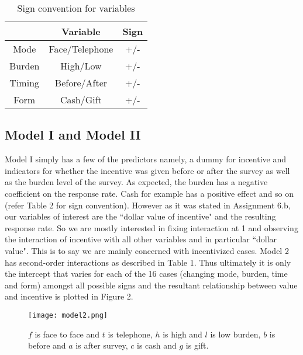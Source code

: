 \documentclass{article}
\begin{document}
\newpage
\begin{table}[H]
\caption {Sign convention for variables}
\vspace{2mm}
\def\arraystretch{1.5}
\centering \begin{tabular}{c c c } 
\hline\hline 
\vspace{1mm}
& Variable & Sign \\ [0.5ex] 
\hline 
Mode & Face/Telephone & +/- \\
Burden & High/Low& +/- \\ 
Timing & Before/After& +/-  \\
Form & Cash/Gift & +/-\\
\hline 
\end{tabular}
\end{table}
\subsection{Model I and Model II}
Model I simply has a few of the predictors namely, a dummy for incentive and indicators for whether the incentive was given before or after the survey as well as the burden level of the survey. As expected, the burden has a negative coefficient on the response rate. Cash for example has a positive effect and so on (refer Table 2 for sign convention). However as it was stated in Assignment 6.b, our variables of interest are the ``dollar value of incentive" and the resulting response rate. So we are mostly interested in fixing interaction at 1 and observing the interaction of incentive with all other variables and in particular ``dollar value". This is to say we are mainly concerned with incentivized cases. Model 2 has second-order interactions as described in Table 1.
Thus ultimately it is only the intercept that varies for each of the 16 cases (changing mode, burden, time and form) amongst all possible signs and the resultant relationship between value and incentive is plotted in Figure 2.
 \begin{figure}[H]
\centering
\texttt{[image: model2.png]}
\caption{$f$ is face to face and $t$ is telephone, $h$ is high and $l$ is low burden, $b$ is before and $a$ is after survey, $c$ is cash and $g$ is gift.}
\label{deltat}
\end{figure}
\end{document}
